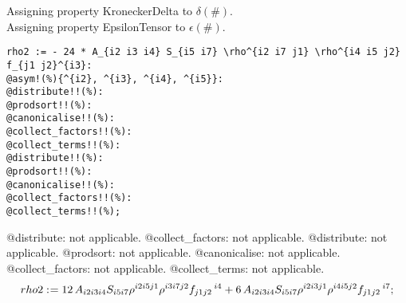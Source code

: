 \documentclass[11pt]{article}
\def\specialcolon{\mathrel{\mathop{:}}\hspace{-.5em}}
\begin{document}
Assigning property KroneckerDelta to $\delta(\#)$.
\\
Assigning property EpsilonTensor to $\epsilon(\#)$.
\\
{\color[named]{Blue}\begin{verbatim}
rho2 := - 24 * A_{i2 i3 i4} S_{i5 i7} \rho^{i2 i7 j1} \rho^{i4 i5 j2} f_{j1 j2}^{i3}:
@asym!(%){^{i2}, ^{i3}, ^{i4}, ^{i5}}:
@distribute!!(%):
@prodsort!!(%):
@canonicalise!!(%):
@collect_factors!!(%):
@collect_terms!!(%):
@distribute!!(%):
@prodsort!!(%):
@canonicalise!!(%):
@collect_factors!!(%):
@collect_terms!!(%);
\end{verbatim}}
@distribute: not applicable.
@collect\_factors: not applicable.
@distribute: not applicable.
@prodsort: not applicable.
@canonicalise: not applicable.
@collect\_factors: not applicable.
@collect\_terms: not applicable.
\begin{dmath*}[compact, spread=2pt]
rho2\specialcolon{}= 12\, {A}_{i2 i3 i4} {S}_{i5 i7} {\rho}^{i2 i5 j1} {\rho}^{i3 i7 j2} {f}_{j1 j2}\,^{i4} + 6\, {A}_{i2 i3 i4} {S}_{i5 i7} {\rho}^{i2 i3 j1} {\rho}^{i4 i5 j2} {f}_{j1 j2}\,^{i7};
\end{dmath*}
\end{document}
